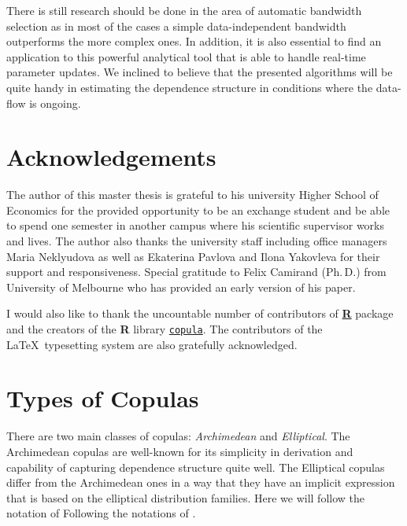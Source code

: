 \documentclass[12pt]{article}
\begin{document}
	There is still research should be done in the area of automatic bandwidth selection as in most of the cases a simple data-independent bandwidth outperforms the more complex ones. In addition, it is also essential to find an application to this powerful analytical tool that is able to handle real-time parameter updates. We inclined to believe that the presented algorithms will be quite handy in estimating the dependence structure in conditions where the data-flow is ongoing.
	
	\section*{Acknowledgements}
	
	The author of this master thesis is grateful to his university Higher School of Economics for the provided opportunity to be an exchange student and be able to spend one semester in another campus where his scientific supervisor works and lives. The author also thanks the university staff including office managers Maria Neklyudova as well as Ekaterina Pavlova and Ilona Yakovleva for their support and responsiveness. Special gratitude to Felix Camirand (Ph.\,D.) from University of Melbourne who has provided an early version of his paper.
	
	I would also like to thank the uncountable number of contributors of \href{https://R-project.org/}{\textbf{R}} package and the creators of the \textbf{R} library \href{https://cran.r-project.org/web/packages/copula/copula.pdf}{\texttt{copula}}. The contributors of the \LaTeX~typesetting system are also gratefully acknowledged. 
	
	\nocite{R} \nocite{Rcopula1} \nocite{Rcopula2} \nocite{Rcopula3} \nocite{Rcopula4}
	
	\printbibliography
	\pagebreak
	\appendix
	\section{Types of Copulas}\label{sec:copula_types}
	
	There are two main classes of copulas: \textit{Archimedean} and \textit{Elliptical}. The Archimedean copulas are well-known for its simplicity in derivation and capability of capturing dependence structure quite well. The Elliptical copulas differ from the Archimedean ones in a way that they have an implicit expression that is based on the elliptical distribution families. Here we will follow the notation of Following the notations of \textcite{Hyrs2015}.
	
\end{document}
